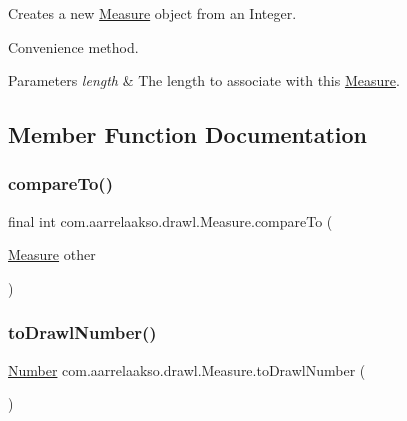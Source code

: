 Creates a new \hyperlink{classcom_1_1aarrelaakso_1_1drawl_1_1_measure}{Measure} object from an Integer. 

Convenience method.


\begin{DoxyParams}{Parameters}
{\em length} & The length to associate with this \hyperlink{classcom_1_1aarrelaakso_1_1drawl_1_1_measure}{Measure}. \\
\hline
\end{DoxyParams}


\subsection{Member Function Documentation}
\mbox{\label{classcom_1_1aarrelaakso_1_1drawl_1_1_measure_a02dc28edb78877bfc79eabe63ddde6f3}} 
\subsubsection{\texorpdfstring{compare\+To()}{compareTo()}}
{\footnotesize\ttfamily final int com.\+aarrelaakso.\+drawl.\+Measure.\+compare\+To (\begin{DoxyParamCaption}\item[{\hyperlink{classcom_1_1aarrelaakso_1_1drawl_1_1_measure}{Measure}}]{other }\end{DoxyParamCaption})}

\mbox{\label{classcom_1_1aarrelaakso_1_1drawl_1_1_measure_a6f01cfe45e01d43e89a73eaa17e3649f}} 
\subsubsection{\texorpdfstring{to\+Drawl\+Number()}{toDrawlNumber()}}
{\footnotesize\ttfamily \hyperlink{interfacecom_1_1aarrelaakso_1_1drawl_1_1_number}{Number} com.\+aarrelaakso.\+drawl.\+Measure.\+to\+Drawl\+Number (\begin{DoxyParamCaption}{ }\end{DoxyParamCaption})\hspace{0.3cm}{\ttfamily [protected]}}



